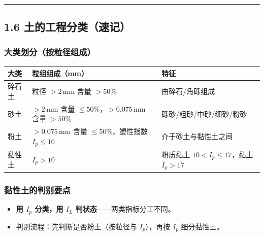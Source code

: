 \documentclass[
]{article}
\newcounter{none} %
\providecommand{\tightlist}{%
  \setlength{\itemsep}{0pt}\setlength{\parskip}{0pt}}
\begin{document}
\begin{center}\rule{0.5\linewidth}{0.5pt}\end{center}

\subsection{1.6
土的工程分类（速记）}\label{ux571fux7684ux5de5ux7a0bux5206ux7c7bux901fux8bb0}

\subsubsection{大类划分（按粒径组成）}\label{ux5927ux7c7bux5212ux5206ux6309ux7c92ux5f84ux7ec4ux6210}

{\def\LTcaptype{none} %
\begin{longtable}[]{@{}
  >{\raggedright\arraybackslash}p{}
  >{\raggedright\arraybackslash}p{}
  >{\raggedright\arraybackslash}p{}@{}}
\toprule\noalign{}
\begin{minipage}[b]{\linewidth}\raggedright
大类
\end{minipage} & \begin{minipage}[b]{\linewidth}\raggedright
粒组组成（mm）
\end{minipage} & \begin{minipage}[b]{\linewidth}\raggedright
特征
\end{minipage} \\
\midrule\noalign{}
\endhead
\bottomrule\noalign{}
\endlastfoot
碎石土 & 粒径 \(>2\,\mathrm{mm}\) 含量 \(>50\%\) & 由碎石/角砾组成 \\
砂土 & \(>2\,\mathrm{mm}\) 含量 \(\le50\%\)，\(>0.075\,\mathrm{mm}\)
含量 \(>50\%\) & 砾砂/粗砂/中砂/细砂/粉砂 \\
粉土 & \(>0.075\,\mathrm{mm}\) 含量 \(\le50\%\)，塑性指数 \(I_p\le10\) &
介于砂土与黏性土之间 \\
黏性土 & \(I_p>10\) & 粉质黏土 \(10<I_p\le17\)，黏土 \(I_p>17\) \\
\end{longtable}
}

\subsubsection{黏性土的判别要点}\label{ux9ecfux6027ux571fux7684ux5224ux522bux8981ux70b9}

\begin{itemize}
\tightlist
\item
  \textbf{用 \(I_p\) 分类，用 \(I_L\) 判状态}------两类指标分工不同。
\item
  判别流程：先判断是否粉土（按粒径与 \(I_p\)），再按 \(I_p\)
  细分黏性土。
\end{itemize}
\end{document}
